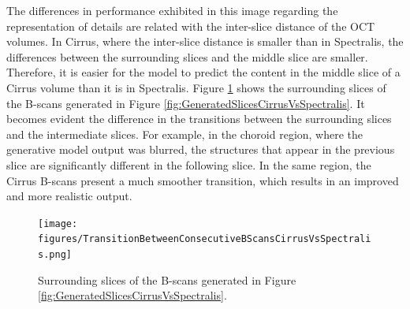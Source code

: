 The differences in performance exhibited in this image regarding the representation of details are related with the inter-slice distance of the OCT volumes. In Cirrus, where the inter-slice distance is smaller than in Spectralis, the differences between the surrounding slices and the middle slice are smaller. Therefore, it is easier for the model to predict the content in the middle slice of a Cirrus volume than it is in Spectralis. Figure \ref{fig:TransitionBetweenConsecutiveBScansCirrusVsSpectralis} shows the surrounding slices of the B-scans generated in Figure \ref{fig:GeneratedSlicesCirrusVsSpectralis}. It becomes evident the difference in the transitions between the surrounding slices and the intermediate slices. For example, in the choroid region, where the generative model output was blurred, the structures that appear in the previous slice are significantly different in the following slice. In the same region, the Cirrus B-scans present a much smoother transition, which results in an improved and more realistic output.

\begin{figure}[!ht]
	\centering	\texttt{[image: figures/TransitionBetweenConsecutiveBScansCirrusVsSpectralis.png]}
	\caption{Surrounding slices of the B-scans generated in Figure \ref{fig:GeneratedSlicesCirrusVsSpectralis}.}
	\label{fig:TransitionBetweenConsecutiveBScansCirrusVsSpectralis}
\end{figure}

